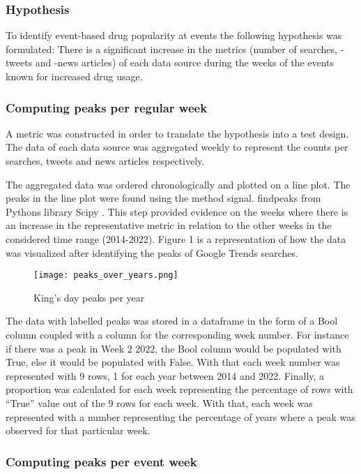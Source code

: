 \subsubsection{Hypothesis}

To identify event-based drug popularity at events the following
hypothesis was formulated:
There is a significant increase in the metrics (number of
searches, -tweets and -news articles) of each data source during
the weeks of the events known for increased drug usage. 

\subsubsection{Computing peaks per regular week}

A metric was constructed in order to translate the hypothesis
into a test design. The data of each data source was aggregated
weekly to represent the counts per searches, tweets and news
articles respectively. 

The aggregated data was ordered chronologically and plotted on a
line plot. The peaks in the line plot were found using the
method signal. findpeaks from Pythons library Scipy \cite{scipy}. 
This step provided evidence on the weeks where there is an
increase in the representative metric in relation to the other
weeks in the considered time range (2014-2022). Figure 1\label{fig:peaks} is a representation of how the data was visualized after identifying the peaks of Google Trends searches.

\begin{figure}[h]
    \texttt{[image: peaks\_over\_years.png]}
    \caption{}{King's day peaks per year}
    \label{fig:peaks}
\end{figure}

The data with labelled peaks was stored in a dataframe in the
form of a Bool column coupled with a column for the
corresponding week number. For instance if there was a peak in
Week 2 2022, the Bool column would be populated with True, else
it would be populated with False. With that each week number was
represented with 9 rows, 1 for each year between 2014 and 2022. 
Finally, a proportion was calculated for each week representing
the percentage of rows with “True” value out of the 9 rows for
each week. With that, each week was represented with a number
representing the percentage of years where a peak was observed
for that particular week.

\subsubsection{Computing peaks per event week}

